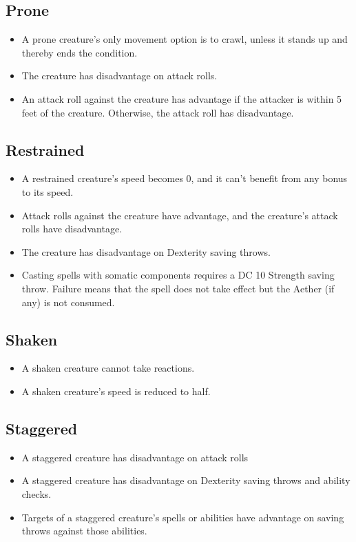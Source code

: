 \subsection{Prone\label{condition:prone}}
\begin{itemize}
\item A prone creature's only movement option is to crawl, unless it stands up and thereby ends the condition.
\item The creature has disadvantage on attack rolls.
\item An attack roll against the creature has advantage if the attacker is within 5 feet of the creature. Otherwise, the attack roll has disadvantage.
\end{itemize}

\subsection{Restrained\label{condition:restrained}}
\begin{itemize}
\item A restrained creature's speed becomes 0, and it can't benefit from any bonus to its speed.
\item Attack rolls against the creature have advantage, and the creature's attack rolls have disadvantage.
\item The creature has disadvantage on Dexterity saving throws.
\item Casting spells with somatic components requires a DC 10 Strength saving throw. Failure means that the spell does not take effect but the Aether (if any) is not consumed.
\end{itemize}

\subsection{Shaken\label{condition:shaken}}
\begin{itemize}
	\item A shaken creature cannot take reactions.
	\item A shaken creature's speed is reduced to half.
\end{itemize}

\subsection{Staggered\label{condition:staggered}}
\begin{itemize}
	\item A staggered creature has disadvantage on attack rolls 
	\item A staggered creature has disadvantage on Dexterity saving throws and ability checks.
	\item Targets of a staggered creature's spells or abilities have advantage on saving throws against those abilities.
\end{itemize}

